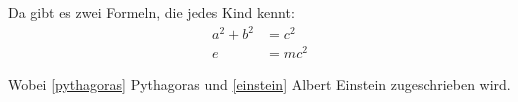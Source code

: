 
Da gibt es zwei Formeln, die jedes Kind kennt: 
\begin{align}
  a^2 + b^2 &= c^2     \label{pythagoras}  \\  
  e &= m c^2           \label{einstein}  
\end{align}

Wobei \eqref{pythagoras} Pythagoras und \eqref{einstein} Albert Einstein zugeschrieben wird.
